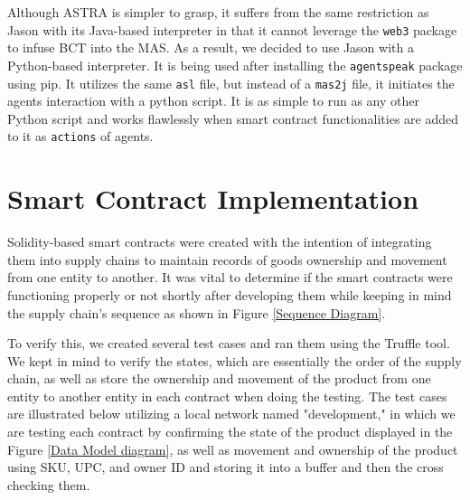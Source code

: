 \vspace{.5cm}

Although ASTRA is simpler to grasp, it suffers from the same restriction as Jason with its Java-based interpreter in that it cannot leverage the \texttt{web3} package to infuse \ac{BCT} into the \ac{MAS}. As a result, we decided to use Jason with a Python-based interpreter. It is being used after installing the \texttt{agentspeak} package using \ac{pip}. It utilizes the same \texttt{asl} file, but instead of a \texttt{mas2j} file, it initiates the agents interaction with a python script. It is as simple to run as any other Python script and works flawlessly when smart contract functionalities are added to it as \texttt{actions} of agents.

\section{Smart Contract Implementation }

Solidity-based smart contracts were created with the intention of integrating them into supply chains to maintain records of goods ownership and movement from one entity to another. It was vital to determine if the smart contracts were functioning properly or not shortly after developing them while keeping in mind the supply chain's sequence as shown in Figure \ref{Sequence Diagram}. 

\vspace{.5cm}

To verify this, we created several test cases and ran them using the Truffle tool. We kept in mind to verify the states, which are essentially the order of the supply chain, as well as store the ownership and movement of the product from one entity to another entity in each contract when doing the testing. The test cases are illustrated below utilizing a local network named "development," in which we are testing each contract by confirming the state of the product displayed in the Figure \ref{Data Model diagram}, as well as movement and ownership of the product using \ac{SKU}, \ac{UPC}, and owner ID and storing it into a buffer and then the cross checking them.

\vspace{.5cm}

